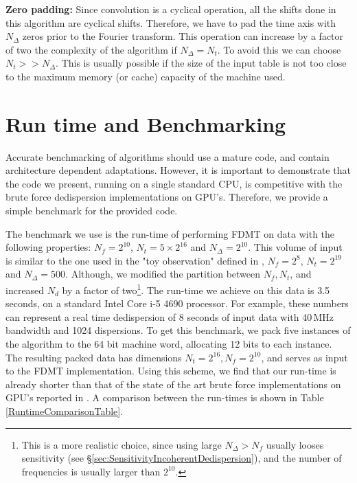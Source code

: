 \documentclass[iop]{emulateapj}
\begin{document}
{\bf Zero padding:}
Since convolution is a cyclical operation, all the shifts done in this algorithm are cyclical shifts. Therefore, we have to pad the time axis with $N_\Delta$ zeros prior to the Fourier transform. This operation can increase by a factor of two the complexity of the algorithm if $N_\Delta=N_t$. To avoid this we can choose $N_t >> N_\Delta$. This is usually possible if the size of the input table is not too close to the maximum memory (or cache) capacity of the machine used.  

\section{Run time and Benchmarking}\label{sec:RuntimeAndBenchmarking}

Accurate benchmarking of algorithms should use a mature code, and contain architecture dependent adaptations.
However, it is important to demonstrate that the code we present, running on a single standard CPU, is competitive with the brute force dedispersion implementations on GPU's.
Therefore, we provide a simple benchmark for the provided code.

The benchmark we use is the run-time of performing FDMT on data with the following properties:
$N_f = 2^{10}$, $N_t = 5\times2^{16}$ and $N_\Delta = 2^{10}$.
This volume of input is similar to the one used in the "toy observation" defined in \citep{GPUDedispersion,GPUsub-bandDedispersion}, $N_f = 2^8$, $N_t = 2^{19}$ and $N_\Delta = 500$. Although, we modified the partition between $N_f,N_t$, and increased $N_d$ by a factor of two\footnote{This is a more realistic choice, since using large $N_\Delta>N_f$ usually looses sensitivity (see \S \ref{sec:SensitivityIncoherentDedispersion}), and the number of frequencies is usually larger than $2^{10}$.}.
The run-time we achieve on this data is 3.5 seconds, on a standard Intel Core i-5 4690 processor.
For example, these numbers can represent a real time dedispersion of 8 seconds of input data with 40\,MHz bandwidth and 1024 dispersions.
To get this benchmark, we pack five instances of the algorithm to the 64 bit machine word, allocating 12 bits to each instance. The resulting packed data has dimensions $N_t = 2^{16},N_f=2^{10}$, and serves as input to the FDMT implementation. Using this scheme, we find that our run-time is already shorter than that of the state of the art brute force implementations on GPU's reported in \citep{GPUDedispersion,GPUsub-bandDedispersion}. A comparison between the run-times is shown in Table \ref{RuntimeComparisonTable}.
\end{document}
